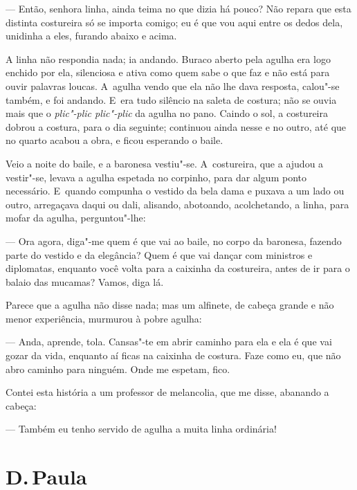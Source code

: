 \begin{linenumbers}
--- Então, senhora linha, ainda teima no que dizia há pouco? Não repara
que esta distinta costureira só se importa comigo; eu é que vou aqui
entre os dedos dela, unidinha a eles, furando abaixo e acima.

A linha não respondia nada; ia andando. Buraco aberto pela agulha era
logo enchido por ela, silenciosa e ativa como quem sabe o que faz e não
está para ouvir palavras loucas. A~agulha vendo que ela não lhe dava
resposta, calou"-se também, e foi andando. E~era tudo silêncio na saleta
de costura; não se ouvia mais que o \emph{plic"-plic plic"-plic} da agulha
no pano. Caindo o sol, a costureira dobrou a costura, para o dia
seguinte; continuou ainda nesse e no outro, até que no quarto acabou a
obra, e ficou esperando o baile.

Veio a noite do baile, e a baronesa vestiu"-se. A~costureira, que a
ajudou a vestir"-se, levava a agulha espetada no corpinho, para dar algum
ponto necessário. E~quando compunha o vestido da bela dama e puxava a um
lado ou outro, arregaçava daqui ou dali, alisando, abotoando,
acolchetando, a linha, para mofar da agulha, perguntou"-lhe:

--- Ora agora, diga"-me quem é que vai ao baile, no corpo da baronesa,
fazendo parte do vestido e da elegância? Quem é que vai dançar com
ministros e diplomatas, enquanto você volta para a caixinha da
costureira, antes de ir para o balaio das mucamas? Vamos, diga lá.

Parece que a agulha não disse nada; mas um alfinete, de cabeça grande e
não menor experiência, murmurou à pobre agulha:

--- Anda, aprende, tola. Cansas"-te em abrir caminho para ela e ela é que
vai gozar da vida, enquanto aí ficas na caixinha de costura. Faze como
eu, que não abro caminho para ninguém. Onde me espetam, fico.

Contei esta história a um professor de melancolia, que me disse,
abanando a cabeça:

--- Também eu tenho servido de agulha a muita linha ordinária!

\end{linenumbers}

\chapter{D.\,Paula}

